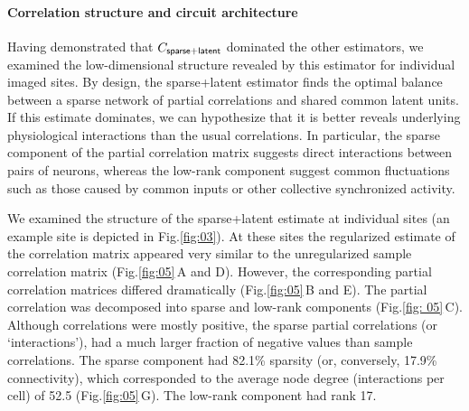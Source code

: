 \documentclass[10pt]{article}
\newcommand{\figref}[2]{Fig.\;\ref{fig:#1}\,#2}
\begin{document}
\paragraph{Correlation structure and circuit architecture}
Having demonstrated that $C_{\sf sparse+latent}$ dominated the other estimators, we examined the low-dimensional structure revealed by this estimator for individual imaged sites. By design, the sparse+latent estimator finds the optimal balance between a sparse network of partial correlations and shared common latent units. If this estimate dominates, we can hypothesize that it is better reveals underlying physiological interactions than the usual correlations. In particular, the sparse component of the partial correlation matrix suggests direct interactions between pairs of neurons, whereas the low-rank component suggest common fluctuations such as those caused by common inputs or other collective synchronized activity. 

We examined the structure of the sparse+latent estimate at individual sites (an example site is depicted in Fig.\;\ref{fig:03}). At these sites the regularized estimate of the correlation matrix appeared very similar to the unregularized sample correlation matrix (\figref{05}{A and D}). However, the corresponding partial correlation matrices differed dramatically (\figref{05}{B and E}). The partial correlation was decomposed into sparse and low-rank components (\figref{ 05}{C}). Although correlations were mostly positive, the sparse partial correlations (or `interactions'), had a much larger fraction of negative values than sample correlations. The sparse component had 82.1\% sparsity (or, conversely, 17.9\% connectivity), which corresponded to the average node degree (interactions per cell) of 52.5 (\figref{05}{G}). The low-rank component had rank 17.
\end{document}
